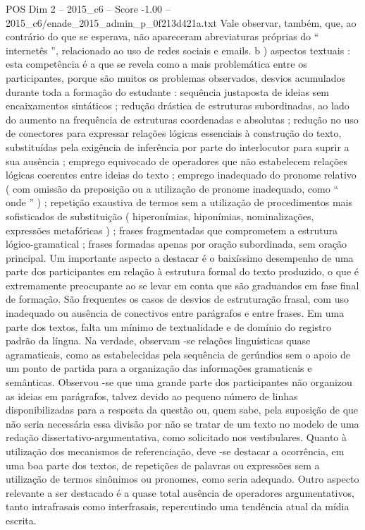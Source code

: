 \begin{textsample}{POS Dim 2 – 2015\_c6 – Score -1.00 – 2015\_c6/enade\_2015\_admin\_p\_0f213d421a.txt}
Vale observar, também, que, ao contrário do que se esperava, não apareceram abreviaturas próprias do “ internetês ”, relacionado ao uso de redes sociais e emails. b ) aspectos textuais : esta competência é a que se revela como a mais problemática entre os participantes, porque são muitos os problemas observados, desvios acumulados durante toda a formação do estudante : sequência justaposta de ideias sem encaixamentos sintáticos ; redução drástica de estruturas subordinadas, ao lado do aumento na frequência de estruturas coordenadas e absolutas ; redução no uso de conectores para expressar relações lógicas essenciais à construção do texto, substituídas pela exigência de inferência por parte do interlocutor para suprir a sua ausência ; emprego equivocado de operadores que não estabelecem relações lógicas coerentes entre ideias do texto ; emprego inadequado do pronome relativo ( com omissão da preposição ou a utilização de pronome inadequado, como “ onde ” ) ; repetição exaustiva de termos sem a utilização de procedimentos mais sofisticados de substituição ( hiperonímias, hiponímias, nominalizações, expressões metafóricas ) ; frases fragmentadas que comprometem a estrutura lógico-gramatical ; frases formadas apenas por oração subordinada, sem oração principal.
Um importante aspecto a destacar é o baixíssimo desempenho de uma parte dos participantes em relação à estrutura formal do texto produzido, o que é extremamente preocupante ao se levar em conta que são graduandos em fase final de formação.
São frequentes os casos de desvios de estruturação frasal, com uso inadequado ou ausência de conectivos entre parágrafos e entre frases.
Em uma parte dos textos, falta um mínimo de textualidade e de domínio do registro padrão da língua.
Na verdade, observam -se relações linguísticas quase agramaticais, como as estabelecidas pela sequência de gerúndios sem o apoio de um ponto de partida para a organização das informações gramaticais e semânticas.
Observou -se que uma grande parte dos participantes não organizou as ideias em parágrafos, talvez devido ao pequeno número de linhas disponibilizadas para a resposta da questão ou, quem sabe, pela suposição de que não seria necessária essa divisão por não se tratar de um texto no modelo de uma redação dissertativo-argumentativa, como solicitado nos vestibulares.
Quanto à utilização dos mecanismos de referenciação, deve -se destacar a ocorrência, em uma boa parte dos textos, de repetições de palavras ou expressões sem a utilização de termos sinônimos ou pronomes, como seria adequado.
Outro aspecto relevante a ser destacado é a quase total ausência de operadores argumentativos, tanto intrafrasais como interfrasais, repercutindo uma tendência atual da mídia escrita.

\end{textsample}
